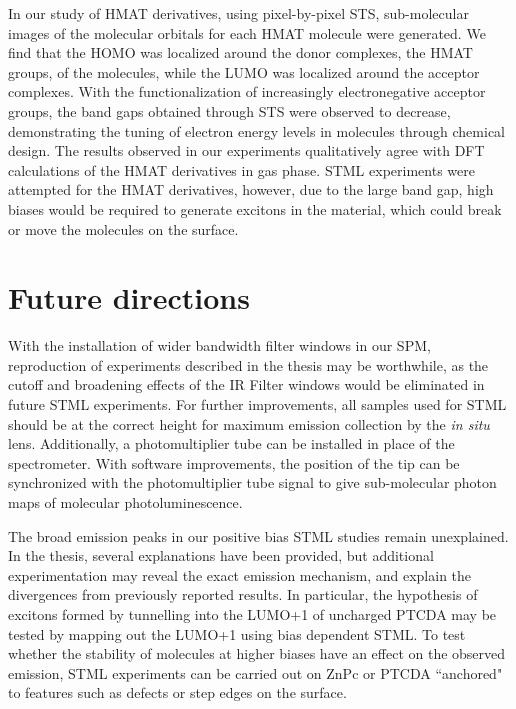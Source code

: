 In our study of HMAT derivatives, using pixel-by-pixel \ac{STS}, sub-molecular images of the molecular orbitals for each HMAT molecule were generated. We find that the HOMO was localized around the donor complexes, the HMAT groups, of the molecules, while the LUMO was localized around the acceptor complexes. With the functionalization of increasingly electronegative acceptor groups, the band gaps obtained through \ac{STS} were observed to decrease, demonstrating the tuning of electron energy levels in molecules through chemical design. The results observed in our experiments qualitatively agree with DFT calculations of the HMAT derivatives in gas phase. \ac{STML} experiments were attempted for the HMAT derivatives, however, due to the large band gap, high biases would be required to generate excitons in the material, which could break or move the molecules on the surface.




\section{Future directions}

With the installation of wider bandwidth filter windows in our \ac{SPM}, reproduction of experiments described in the thesis may be worthwhile, as the cutoff and broadening effects of the IR Filter windows would be eliminated in future \ac{STML} experiments. For further improvements, all samples used for \ac{STML} should be at the correct height for maximum emission collection by the \textit{in situ} lens. Additionally, a photomultiplier tube can be installed in place of the spectrometer. With software improvements, the position of the tip can be synchronized with the photomultiplier tube signal to give sub-molecular photon maps of molecular photoluminescence.

The broad emission peaks in our positive bias \ac{STML} studies remain unexplained. In the thesis, several explanations have been provided, but additional experimentation may reveal the exact emission mechanism, and explain the divergences from previously reported results. In particular, the hypothesis of excitons formed by tunnelling into the LUMO+1 of uncharged \ac{PTCDA} may be tested by mapping out the LUMO+1 using bias dependent \ac{STML}. To test whether the stability of molecules at higher biases have an effect on the observed emission, \ac{STML} experiments can be carried out on \ac{ZnPc} or \ac{PTCDA} ``anchored" to features such as defects or step edges on the surface. 

